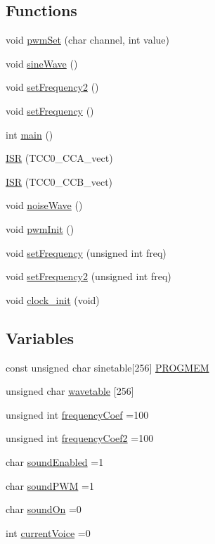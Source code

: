 \subsection*{Functions}
\begin{DoxyCompactItemize}
\item 
void \hyperlink{~main_8c_a840070ef659b7bca801ae8305d06a340}{pwm\-Set} (char channel, int value)
\item 
void \hyperlink{~main_8c_a03a0ea567c1b201e084da36acd2cb9d2}{sine\-Wave} ()
\item 
void \hyperlink{~main_8c_ade151b02bd65aa70020010d27245c70f}{set\-Frequency2} ()
\item 
void \hyperlink{~main_8c_a0c36db54a91957a6b8c91a9932f74d16}{set\-Frequency} ()
\item 
int \hyperlink{~main_8c_ae66f6b31b5ad750f1fe042a706a4e3d4}{main} ()
\item 
\hyperlink{~main_8c_a0763252836531eeb42258e71bf9710be}{I\-S\-R} (T\-C\-C0\-\_\-\-C\-C\-A\-\_\-vect)
\item 
\hyperlink{~main_8c_a3a29512a08fa8ec3dca462721c2bc7c5}{I\-S\-R} (T\-C\-C0\-\_\-\-C\-C\-B\-\_\-vect)
\item 
void \hyperlink{~main_8c_a707762300647c61a4ee156f653ab29d0}{noise\-Wave} ()
\item 
void \hyperlink{~main_8c_acab6fb947010dfc3cde0f372ea86b008}{pwm\-Init} ()
\item 
void \hyperlink{~main_8c_a78753f94632ac18ee055de50e473d519}{set\-Frequency} (unsigned int freq)
\item 
void \hyperlink{~main_8c_ae78b83612374b4b303c1c0f32362e41e}{set\-Frequency2} (unsigned int freq)
\item 
void \hyperlink{~main_8c_a78ab77b57cf2e00089f0a3a22508524c}{clock\-\_\-init} (void)
\end{DoxyCompactItemize}
\subsection*{Variables}
\begin{DoxyCompactItemize}
\item 
const unsigned char sinetable\mbox{[}256\mbox{]} \hyperlink{~main_8c_adda78152bf8af9407c0a22deb795d689}{P\-R\-O\-G\-M\-E\-M}
\item 
unsigned char \hyperlink{~main_8c_abc5f735c8235e23b42a484b2744e6a05}{wavetable} \mbox{[}256\mbox{]}
\item 
unsigned int \hyperlink{~main_8c_aa5042ede4121ddfe2b77b83e965d3ce7}{frequency\-Coef} =100
\item 
unsigned int \hyperlink{~main_8c_a1f5b04455abb645a315e61b460cece5d}{frequency\-Coef2} =100
\item 
char \hyperlink{~main_8c_a487767231970dc5871caf94a31630459}{sound\-Enabled} =1
\item 
char \hyperlink{~main_8c_aa1156b1e5639b3855f6d711de3799023}{sound\-P\-W\-M} =1
\item 
char \hyperlink{~main_8c_a522507a13e786061113a0a66d66896ab}{sound\-On} =0
\item 
int \hyperlink{~main_8c_a7b2cf7f8cf113a3976b1ed3dd8dc0d80}{current\-Voice} =0
\end{DoxyCompactItemize}


